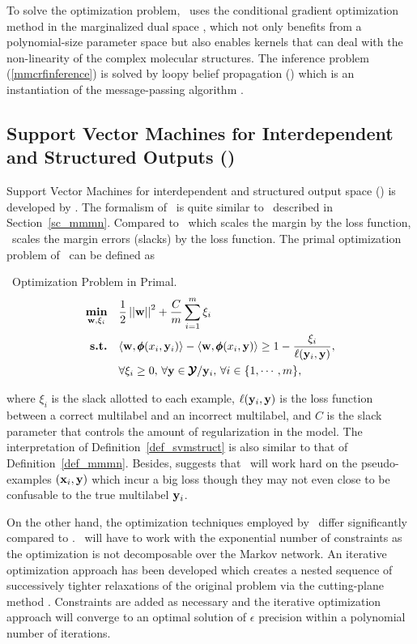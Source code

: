 {To solve the optimization problem, \mmcrf\ uses the conditional gradient optimization method \citep{Bertsekas95nonlinear} in the marginalized dual space \citep{Taskar04max}, which not only benefits from a polynomial-size parameter space but also enables kernels that can deal with the non-linearity of the complex molecular structures.
The inference problem (\ref{mmcrfinference}) is solved by loopy belief propagation (\lbp) which is an instantiation of the message-passing algorithm \citep{Wainwright08graphical}.



%
% 
\subsection{Support Vector Machines for Interdependent and Structured Outputs (\svmstruct)} \label{sc_svmstruct}

Support Vector Machines for interdependent and structured output space (\svmstruct) is developed by \citet{THJA04,TJTA05}.
The formalism of \svmstruct\ is quite similar to \mmmn\ described in Section~\ref{sc_mmmn}.
Compared to \mmmn\ which scales the margin by the loss function, \svmstruct\ scales the margin errors ({slacks}) by the loss function.
The primal optimization problem of \svmstruct\ can be defined as
\begin{definition}{\svmstruct\ Optimization Problem in Primal.}\label{def_svmstruct}
	\begin{align*}
		\underset{\mathbf {w},\xi_i}{\textbf{min}} & \quad\frac{1}{2}\left|\left| \mathbf {w} \right|\right|^2 + \frac{C}{m}\sum_{i=1}^{m}\xi_i \\
		\textbf{s.t.} & \quad\langle \mathbf {w}, \pmb \phi(x_i,\mathbf {y}_i) \rangle - \langle \mathbf {w}, \pmb \phi(x_i,\mathbf {y}) \rangle \ge 1-\frac{\xi_i}{\mathbf {\ell}(\mathbf {y}_i,\mathbf {y})},\\
		& \quad \forall \xi_i\ge0,\, \forall \mathbf {y}\in\pmb {\mathcal{Y}}/\mathbf {y}_i,\, \forall i\in\{1,\cdots,m\},
	\end{align*}
\end{definition}
\noindent
where $\xi_i$ is the slack allotted to each example, $\mathbf {\ell}(\mathbf {y}_i,\mathbf {y})$ is the loss function between a correct multilabel and an incorrect multilabel, and $C$ is the slack parameter that controls the amount of regularization in the model.
The interpretation of Definition~\ref{def_svmstruct} is also similar to that of Definition~\ref{def_mmmn}.
Besides, \citet{THJA04} suggests that \mmmn\ will work hard on the pseudo-examples $(\mathbf {x}_i,\mathbf {y})$ which incur a big loss though they may not even close to be confusable to the true multilabel $\mathbf {y}_i$.

On the other hand, the optimization techniques employed by \svmstruct\ differ significantly compared to \mmmn.
\svmstruct\ will have to work with the exponential number of constraints as the optimization is not decomposable over the Markov network.
An iterative optimization approach \citep{THJA04} has been developed which creates a nested sequence of successively tighter relaxations of the original problem via the cutting-plane method \citep{Bishop07,JFY09}.
Constraints are added as necessary and the iterative optimization approach will converge to an optimal solution of $\epsilon$ precision within a polynomial number of iterations.

}
